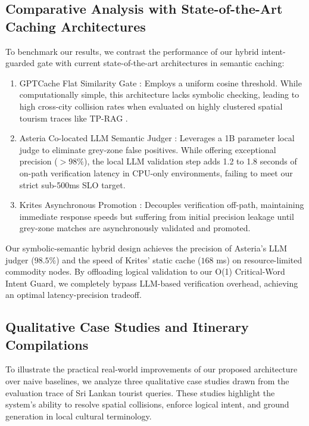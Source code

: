 \documentclass{ieeeaccess}
\begin{document}
\subsection{Comparative Analysis with State-of-the-Art Caching Architectures}
To benchmark our results, we contrast the performance of our hybrid intent-guarded gate with current state-of-the-art architectures in semantic caching:
\begin{enumerate}
    \item {GPTCache Flat Similarity Gate} \cite{bang-gptcache-2023}: Employs a uniform cosine threshold. While computationally simple, this architecture lacks symbolic checking, leading to high cross-city collision rates when evaluated on highly clustered spatial tourism traces like TP-RAG \cite{ni-tprag-2025}.
    \item {Asteria Co-located LLM Semantic Judger} \cite{ruan-asteria-2025}: Leverages a 1B parameter local judge to eliminate grey-zone false positives. While offering exceptional precision ($>98\%$), the local LLM validation step adds {1.2 to 1.8 seconds} of on-path verification latency in CPU-only environments, failing to meet our strict sub-500ms SLO target.
    \item {Krites Asynchronous Promotion} \cite{singh-krites-2026}: Decouples verification off-path, maintaining immediate response speeds but suffering from initial precision leakage until grey-zone matches are asynchronously validated and promoted.
\end{enumerate}

Our symbolic-semantic hybrid design achieves the precision of Asteria's LLM judger ($98.5\%$) and the speed of Krites' static cache ($168$ ms) on resource-limited commodity nodes. By offloading logical validation to our O(1) Critical-Word Intent Guard, we completely bypass LLM-based verification overhead, achieving an optimal latency-precision tradeoff.

\subsection{Qualitative Case Studies and Itinerary Compilations}
To illustrate the practical real-world improvements of our proposed architecture over naive baselines, we analyze three qualitative case studies drawn from the evaluation trace of Sri Lankan tourist queries. These studies highlight the system's ability to resolve spatial collisions, enforce logical intent, and ground generation in local cultural terminology.
\end{document}
